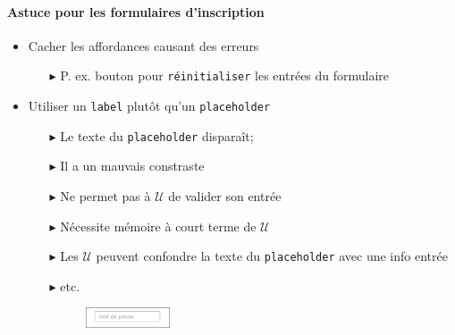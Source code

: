 \documentclass{report}
\begin{document}
\begin{multicols*}{3}
\begin{itemize}
    \paragraph{Astuce pour les formulaires d'inscription}


    \begin{itemize}
      \item Cacher les affordances causant des erreurs 
        \begin{itemize}
          \item [$\blacktriangleright$ ] P. ex. bouton pour 
            \texttt{réinitialiser} les entrées du formulaire  
        \end{itemize}

      \item Utiliser un \texttt{label} plutôt qu'un 
        \texttt{placeholder}    
      \begin{itemize}
        \item [$\blacktriangleright$ ] Le texte du 
          \texttt{placeholder} disparaît;    
        \item [$\blacktriangleright$ ]
          Il a un mauvais constraste 
        \item [$\blacktriangleright$ ]
          Ne permet pas à $\mathcal{U}$ de valider son entrée   
        \item [$\blacktriangleright$ ]
          Nécessite mémoire à court terme de $\mathcal{U}$
        \item [$\blacktriangleright$ ]
          Les $\mathcal{U}$ peuvent confondre la texte 
          du \texttt{placeholder} avec une info entrée   
        \item [$\blacktriangleright$ ]
          etc. 
          \begin{figure}[H]
          \begin{center}
            \includegraphics[width=0.25\textwidth]{placeholder.png}
          \end{center}
        \end{figure}
        

\end{itemize}
\end{itemize}
\end{itemize}
\end{multicols*}
\end{document}
